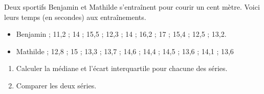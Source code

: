 \documentclass[11pt]{article}
\begin{document}
\begin{exercice}[Application]
    Deux sportifs Benjamin et Mathilde s'entraînent pour courir un cent mètre. Voici leurs temps (en secondes) aux entraînements.

    \begin{itemize}
      \item 
        Benjamin
        ; 11,2
        ; 14
        ; 15,5
        ; 12,3
        ; 14
        ; 16,2
        ; 17
        ; 15,4
        ; 12,5
        ; 13,2.
      \item 
        Mathilde
        ; 12,8
        ; 15
        ; 13,3
        ; 13,7
        ; 14,6
        ; 14,4
        ; 14,5
        ; 13,6
        ; 14,1
        ; 13,6
    \end{itemize}

  \begin{enumerate}
    \item Calculer la médiane et l'écart interquartile pour chacune des séries.
    \item Comparer les deux séries.
  \end{enumerate}
\end{exercice}
\end{document}
